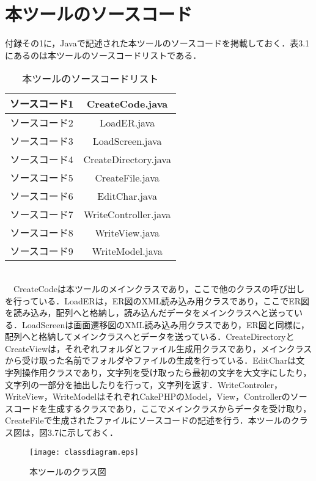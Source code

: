 \documentclass{funthesis}
\begin{document}
\section{本ツールのソースコード}
付録その1に，Javaで記述された本ツールのソースコードを掲載しておく．表3.1にあるのは本ツールのソースコードリストである．
\begin{table}[htb]
  \begin{center}
    \caption{本ツールのソースコードリスト}
    \begin{tabular}{|c|c|} \hline
      ソースコード1 & CreateCode.java\\ \hline
      ソースコード2 & LoadER.java\\ \hline
      ソースコード3 & LoadScreen.java \\ \hline
      ソースコード4 & CreateDirectory.java \\ \hline
      ソースコード5 & CreateFile.java \\ \hline
      ソースコード6 & EditChar.java \\ \hline
      ソースコード7 & WriteController.java \\ \hline
      ソースコード8 & WriteView.java \\ \hline
      ソースコード9 & WriteModel.java \\ \hline
    \end{tabular}
  \end{center}
\end{table}\\
　CreateCodeは本ツールのメインクラスであり，ここで他のクラスの呼び出しを行っている．LoadERは，ER図のXML読み込み用クラスであり，ここでER図を読み込み，配列へと格納し，読み込んだデータをメインクラスへと送っている．LoadScreenは画面遷移図のXML読み込み用クラスであり，ER図と同様に，配列へと格納してメインクラスへとデータを送っている．CreateDirectoryとCreateViewは，それぞれフォルダとファイル生成用クラスであり，メインクラスから受け取った名前でフォルダやファイルの生成を行っている．EditCharは文字列操作用クラスであり，文字列を受け取ったら最初の文字を大文字にしたり，文字列の一部分を抽出したりを行って，文字列を返す．WriteControler，WriteView，WriteModelはそれぞれCakePHPのModel，View，Controllerのソースコードを生成するクラスであり，ここでメインクラスからデータを受け取り，CreateFileで生成されたファイルにソースコードの記述を行う．本ツールのクラス図は，図3.7に示しておく．
\begin{figure*}[h]
\begin{center}
\texttt{[image: classdiagram.eps]}
\caption{本ツールのクラス図}
\end{center}
\end{figure*}
\\
\end{document}
